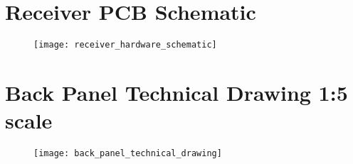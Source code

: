 \documentclass [11pt]{article}
\begin{document}
\section{Receiver PCB Schematic}\label{app:receiver_hardware_schematic}
\begin{figure}[H]
\centerline{\texttt{[image: receiver\_hardware\_schematic]}}
\end{figure}

\section{Back Panel Technical Drawing 1:5 scale}\label{app:back_panel_technical_drawing}
\begin{figure}[H]
\centerline{\texttt{[image: back\_panel\_technical\_drawing]}}
\end{figure}
\end{document}
